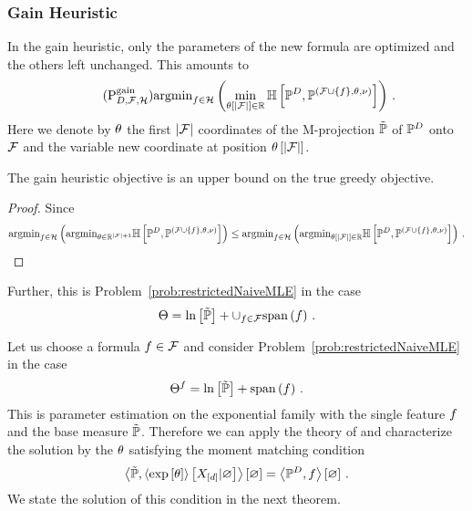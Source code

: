 \subsubsection{Gain Heuristic}

In the gain heuristic, only the parameters of the new formula are optimized and the others left unchanged.
This amounts to 
\begin{align}\label{prob:greedyGain}\tag{$\mathrm{P}^{\mathrm{gain}}_{\datamap,\formulaset,\fselectionmap}$}
	\argmin_{\formula\in\fselectionmap} \left ( \min_{\canparamat{\cardof{\formulaset}}\in\rr} 
	\centropyof{\empdistribution}{\expdistof{(\formulaset\cup\{\formula\},\canparam,\basemeasure)}} \right) \, . 
\end{align}
Here we denote by $\theta$ the first $\left|\mathcal{F}\right|$ coordinates of the M-projection $\tilde{\mathbb{P}}$  of $\mathbb{P}^{D}$ onto $\mathcal{F}$ and the variable new coordinate at position $\theta\left[\left|\mathcal{F}\right|\right]$.

\begin{lemma}
	The gain heuristic objective is an upper bound on the true greedy objective. 
\end{lemma}
\begin{proof}
Since
\begin{align*}
	\mathrm{argmin}_{f\in\mathcal{H}} \left( \mathrm{argmin}_{\theta\in\mathbb{R}^{\left|\mathcal{F}\right|+1}} 
	\mathbb{H}\left[\mathbb{P}^{D},\mathbb{P}^{(\mathcal{F}\cup\{f\},\theta,\nu)}\right] \right)
	\leq 	\mathrm{argmin}_{f\in\mathcal{H}} \left ( \mathrm{argmin}_{\theta\left[\left|\mathcal{F}\right|\right]\in\mathbb{R}} 
	\mathbb{H}\left[\mathbb{P}^{D},\mathbb{P}^{(\mathcal{F}\cup\{f\},\theta,\nu)}\right] \right) \, . 
\end{align*}
\end{proof}


Further, this is Problem~\eqref{prob:restrictedNaiveMLE} in the case
\begin{align*}
	\Theta = \ln \left[ \tilde{\mathbb{P}} \right] + \cup_{f\in\mathcal{F}} \mathrm{span}\left(f\right) \, .
\end{align*}



Let us choose a formula $f\in\mathcal{F}$ and consider Problem~\ref{prob:restrictedNaiveMLE}  in the case
\begin{align*}
	\Theta^{f} = \ln \left[ \tilde{\mathbb{P}} \right] + \mathrm{span}\left(f\right) \, . 
\end{align*}
This is parameter estimation on the exponential family with the single feature $f$ and the base measure $\tilde{\mathbb{P}}$.
Therefore we can apply the theory of  and characterize the solution by the $\theta$ satisfying the moment matching condition
\begin{align*}
	\left\langle \tilde{\mathbb{P}}, \left\langle \mathrm{exp}\left[\theta\right]\right\rangle \left[ X_{[d]} | \varnothing \right] \right\rangle \left[ \varnothing \right] = \left\langle \mathbb{P}^{D}, f\right\rangle \left[ \varnothing \right] \, . 
\end{align*}
We state the solution of this condition in the next theorem.

